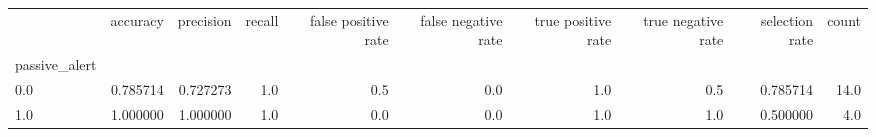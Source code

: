\begin{tabular}{lrrrrrrrrr}
\toprule
{} &  accuracy &  precision &  recall &  false positive rate &  false negative rate &  true positive rate &  true negative rate &  selection rate &  count \\
passive\_alert &           &            &         &                      &                      &                     &                     &                 &        \\
\midrule
0.0           &  0.785714 &   0.727273 &     1.0 &                  0.5 &                  0.0 &                 1.0 &                 0.5 &        0.785714 &   14.0 \\
1.0           &  1.000000 &   1.000000 &     1.0 &                  0.0 &                  0.0 &                 1.0 &                 1.0 &        0.500000 &    4.0 \\
\bottomrule
\end{tabular}
